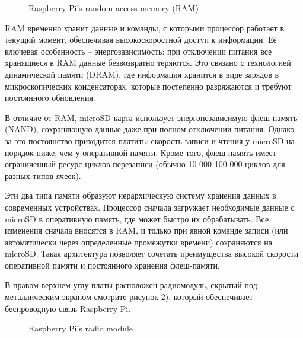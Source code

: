 \begin{figure}[H]
	\centering
	\caption{Raspberry Pi’s random access memory (RAM)}
	\label{fig:ram}
\end{figure}

 RAM временно хранит данные и команды, с которыми процессор работает в текущий момент, обеспечивая высокоскоростной доступ к информации. Её ключевая особенность -- энергозависимость: при отключении питания все хранящиеся в RAM данные безвозвратно теряются. Это связано с технологией динамической памяти (DRAM), где информация хранится в виде зарядов в микроскопических конденсаторах, которые постепенно разряжаются и требуют постоянного обновления.

В отличие от RAM, microSD-карта использует энергонезависимую флеш-память (NAND), сохраняющую данные даже при полном отключении питания. Однако за это постоянство приходится платить: скорость записи и чтения у microSD на порядок ниже, чем у оперативной памяти. Кроме того, флеш-память имеет ограниченный ресурс циклов перезаписи (обычно 10 000-100 000 циклов для разных типов ячеек).

Эти два типа памяти образуют иерархическую систему хранения данных в современных устройствах. Процессор сначала загружает необходимые данные с microSD в оперативную память, где может быстро их обрабатывать. Все изменения сначала вносятся в RAM, и только при явной команде записи (или автоматически через определенные промежутки времени) сохраняются на microSD. Такая архитектура позволяет сочетать преимущества высокой скорости оперативной памяти и постоянного хранения флеш-памяти.

В правом верхнем углу платы расположен радиомодуль, скрытый под металлическим экраном смотрите рисунок \ref{fig:radio_module}), который обеспечивает беспроводную связь Raspberry Pi.

\begin{figure}[H]
	\centering
	\caption{Raspberry Pi’s radio module}
	\label{fig:radio_module}
\end{figure}

